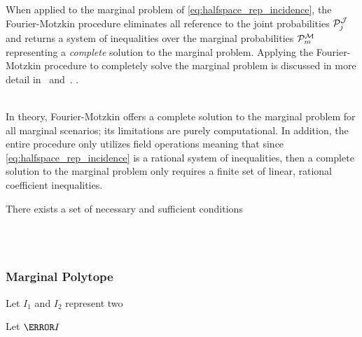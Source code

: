 \documentclass[aps, 10pt, english, twoside, pra, nofootinbib, longbibliography]{revtex4-1}
\begin{document}
    When applied to the marginal problem of \cref{eq:halfspace_rep_incidence}, the Fourier-Motzkin procedure eliminates all reference to the joint probabilities $\probvec^{\jointvar}_j$ and returns a system of inequalities over the marginal probabilities $\probvec^{\mscenario}_m$ representing a \textit{complete} solution to the marginal problem. Applying the Fourier-Motzkin procedure to completely solve the marginal problem is discussed in more detail in~\cite{Inflation} and~\cite{Fritz_2011}. . \\

    \\

    \begin{remark}
        In theory, Fourier-Motzkin offers a complete solution to the marginal problem for all marginal scenarios; its limitations are purely computational. In addition, the entire procedure only utilizes field operations \cite{Abramsky_2012} meaning that since \cref{eq:halfspace_rep_incidence} is a rational system of inequalities, then a complete solution to the marginal problem only requires a finite set of linear, rational coefficient inequalities.
    \end{remark}

    \begin{theorem}
        There exists a set of necessary and sufficient conditions

    \end{theorem}



     \\
     \\
    \subsubsection{Marginal Polytope}
    \begin{definition}
        Let $I_{1}$ and $I_{2}$ represent two
    \end{definition}
    \begin{definition}
        Let $\s{I}$
    \end{definition}
\end{document}
